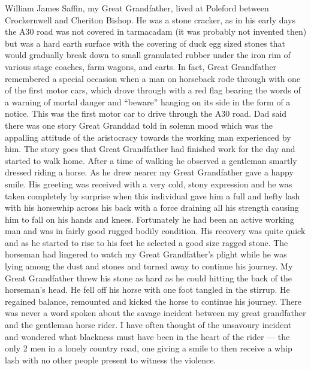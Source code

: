 
William James Saffin, my Great Grandfather, lived at Poleford between
Crockernwell and Cheriton Bishop. He was a stone cracker, as in his early days
the A30 road was not covered in tarmacadam (it was probably not invented then)
but was a hard earth surface with the covering of duck egg sized stones that
would gradually break down to small granulated rubber under the iron rim of
various stage coaches, farm wagons, and carts. In fact, Great Grandfather
remembered a special occasion when a man on horseback rode through with one of
the first motor cars, which drove through with a red flag bearing the words of
a warning of mortal danger and ``beware'' hanging on its side in the form of a
notice. This was the first motor car to drive through the A30 road. Dad said
there was one story Great Granddad told in solemn mood which was the appalling
attitude of the aristocracy towards the working man experienced by him. The
story goes that Great Grandfather had finished work for the day and started to
walk home. After a time of walking he observed a gentleman smartly dressed
riding a horse. As he drew nearer my Great Grandfather gave a happy smile. His
greeting was received with a very cold, stony expression and he was taken
completely by surprise when this individual gave him a full and hefty lash with
his horsewhip across his back with a force draining all his strength causing
him to fall on his hands and knees. Fortunately he had been an active working
man and was in fairly good rugged bodily condition. His recovery was quite
quick and as he started to rise to his feet he selected a good size ragged
stone. The horseman had lingered to watch my Great Grandfather's plight while
he was lying among the dust and stones and turned away to continue his journey.
My Great Grandfather threw his stone as hard as he could hitting the back of
the horseman's head. He fell off his horse with one foot tangled in the
stirrup. He regained balance, remounted and kicked the horse to continue his
journey. There was never a word spoken about the savage incident between my
great grandfather and the gentleman horse rider. I have often thought of the
unsavoury incident and wondered what blackness must have been in the heart of
the rider --- the only 2 men in a lonely country road, one giving a smile to
then receive a whip lash with no other people present to witness the violence.

